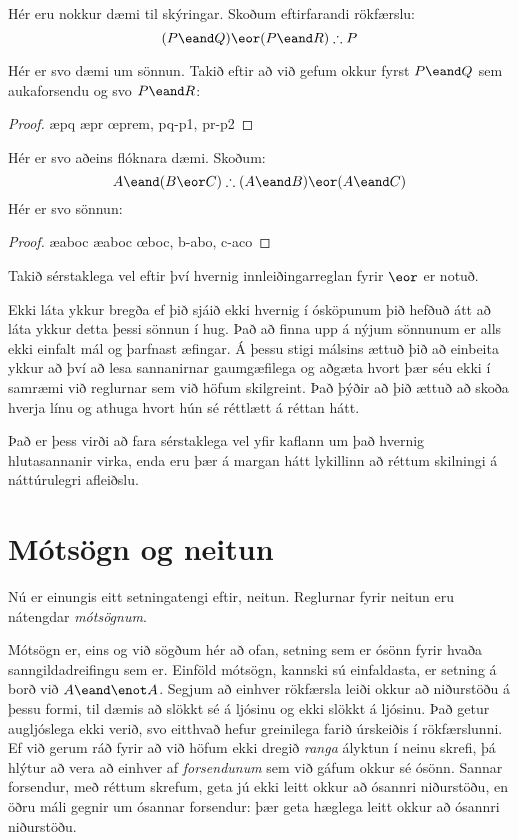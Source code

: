 Hér eru nokkur dæmi til skýringar. Skoðum eftirfarandi rökfærslu:
$$(P \eand Q) \eor (P \eand R) \therefore P$$

Hér er svo dæmi um sönnun. Takið eftir að við gefum okkur fyrst $P \eand Q$ sem aukaforsendu og svo $P \eand R$:
	\begin{proof}
			\open
				\ae{pq}
			\close
			\open
				\ae{pr}
			\close
		\oe{prem, pq-p1, pr-p2}
	\end{proof}
Hér er svo aðeins flóknara dæmi. Skoðum:
	$$ A \eand (B \eor C) \therefore (A \eand B) \eor (A \eand C)$$
Hér er svo sönnun:
	\begin{proof}
		\ae{aboc}
		\ae{aboc}
		\open
		\close
		\open
		\close
	\oe{boc, b-abo, c-aco}
	\end{proof}
Takið sérstaklega vel eftir því hvernig innleiðingarreglan fyrir $\eor$ er notuð.

Ekki láta ykkur bregða ef þið sjáið ekki hvernig í ósköpunum þið hefðuð átt að láta ykkur detta þessi sönnun í hug. Það að finna upp á nýjum sönnunum er alls ekki einfalt mál og þarfnast æfingar. Á þessu stigi málsins ættuð þið að einbeita ykkur að því að lesa sannanirnar gaumgæfilega og aðgæta hvort þær séu ekki í samræmi við reglurnar sem við höfum skilgreint. Það þýðir að þið ættuð að skoða hverja línu og athuga hvort hún sé réttlætt á réttan hátt.

Það er þess virði að fara sérstaklega vel yfir kaflann um það hvernig hlutasannanir virka, enda eru þær á margan hátt lykillinn að réttum skilningi á náttúrulegri afleiðslu.

\section{Mótsögn og neitun}

Nú er einungis eitt setningatengi eftir, neitun. Reglurnar fyrir neitun eru nátengdar \emph{mótsögnum}.

Mótsögn er, eins og við sögðum hér að ofan, setning sem er ósönn fyrir hvaða sanngildadreifingu sem er. Einföld mótsögn, kannski sú einfaldasta, er setning á borð við $A \eand \enot A$. Segjum að einhver rökfærsla leiði okkur að niðurstöðu á þessu formi, til dæmis að slökkt sé á ljósinu og ekki slökkt á ljósinu. Það getur augljóslega ekki verið, svo eitthvað hefur greinilega farið úrskeiðis í rökfærslunni. Ef við gerum ráð fyrir að við höfum ekki dregið \emph{ranga} ályktun í neinu skrefi, þá hlýtur að vera að einhver af \emph{forsendunum} sem við gáfum okkur sé ósönn. Sannar forsendur, með réttum skrefum, geta jú ekki leitt okkur að ósannri niðurstöðu, en öðru máli gegnir um ósannar forsendur: þær geta hæglega leitt okkur að ósannri niðurstöðu.

